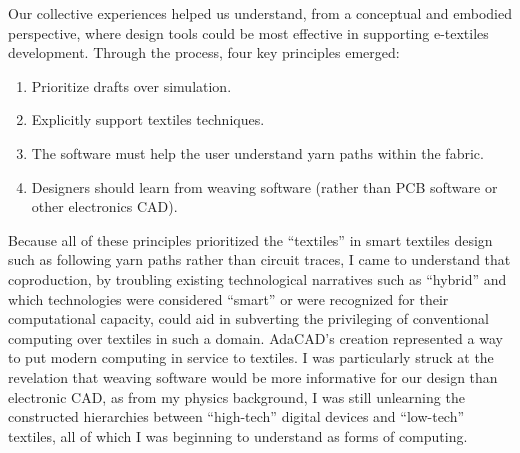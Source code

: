 Our collective experiences helped us understand, from a conceptual and embodied perspective, where design tools could be most effective in supporting e-textiles development. Through the process, four key principles emerged:

\begin{enumerate}
\item Prioritize drafts over simulation.
\item Explicitly support textiles techniques.
\item The software must help the user understand yarn paths within the fabric.
\item Designers should learn from weaving software (rather than PCB software or other electronics CAD).
\end{enumerate}

Because all of these principles prioritized the ``textiles'' in smart textiles design such as following yarn paths rather than circuit traces, I came to understand that coproduction, by troubling existing technological narratives such as ``hybrid'' and which technologies were considered ``smart'' or were recognized for their computational capacity, could aid in subverting the privileging of conventional computing over textiles in such a domain. AdaCAD's creation represented a way to put modern computing in service to textiles. I was particularly struck at the revelation that weaving software would be more informative for our design than electronic CAD, as from my physics background, I was still unlearning the constructed hierarchies between ``high-tech'' digital devices and ``low-tech'' textiles, all of which I was beginning to understand as forms of computing.


